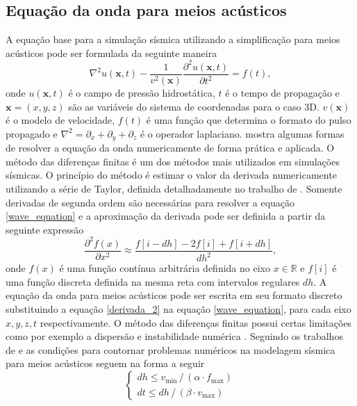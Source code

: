 \subsection*{Equação da onda para meios acústicos}

A equação base para a simulação sísmica utilizando a simplificação para meios acústicos pode ser formulada da seguinte maneira
\begin{equation}
	\nabla^2u(\mathbf{x}, t) - \dfrac{1}{v^2(\mathbf{x})}\dfrac{\partial^2u(\mathbf{x}, t)}{\partial t^2} = f(t),	
	\label{wave_equation}
\end{equation}
\noindent onde $u(\mathbf{x},t)$ é o campo de pressão hidrostática, $t$ é o tempo de propagação e $\mathbf{x} = (x,y,z)$ são as variáveis do sistema de coordenadas para o caso 3D. $v(\mathbf{x})$ é o modelo de velocidade, $f(t)$ é uma função que determina o formato do pulso propagado e $\nabla^2 = \partial_x + \partial_y + \partial_z$ é o operador laplaciano.  mostra algumas formas de resolver a equação da onda numericamente de forma prática e aplicada. O método das diferenças finitas é um dos métodos mais utilizados em simulações sísmicas. O princípio do método é estimar o valor da derivada numericamente utilizando a série de Taylor, definida detalhadamente no trabalho de . Somente derivadas de segunda ordem são necessárias para resolver a equação \ref{wave_equation} e a aproximação da derivada pode ser definida a partir da seguinte expressão
\begin{equation}
	\dfrac{\partial^2 f(x)}{\partial x^2} \approx \dfrac{f[i - dh] - 2f[i] + f[i + dh]}{dh^2},
	\label{derivada_2}
\end{equation}    
\noindent onde $f(x)$ é uma função contínua arbitrária definida no eixo $x \in \mathbb{R}$ e $f[i]$ é uma função discreta definida na mesma reta com intervalos regulares $dh$. A equação da onda para meios acústicos pode ser escrita em seu formato discreto  substituindo a equação \ref{derivada_2} na equação \ref{wave_equation}, para cada eixo $x,y,z,t$ respectivamente. O método das diferenças finitas possui certas limitações como por exemplo a dispersão e instabilidade numérica \cite{aki1980quantitative}. Seguindo os trabalhos de  e  as condições para contornar problemas numéricos na modelagem sísmica para meios acústicos seguem na forma a seguir
\begin{equation}
	\begin{cases}
		dh \le v_{\text{min}} \,/\, (\alpha \cdot f_{\text{max}}) \\
		dt \le dh \,/\, (\beta \cdot v_{\text{max}})
	\end{cases}
\end{equation}   
